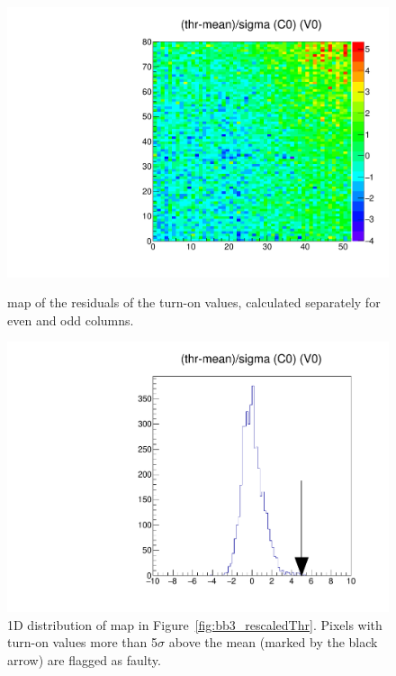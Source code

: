 \begin{figure}[!Hp]
\centering
\begin{minipage}{0.45\textwidth}
  \includegraphics[width=1.0\textwidth]{figures/bb3_rescaledThr.pdf}
  \caption{\roc map of the residuals of the \vthrcomp turn-on values, 
  calculated separately for even and odd columns.}
  \label{fig:bb3_rescaledThr}
\end{minipage}
\hspace{0.3cm}
\begin{minipage}{0.45\textwidth}
  \includegraphics[width=1.0\textwidth]{figures/bb3_dist_rescaledThr.pdf}
  \caption{1D distribution of \roc map in Figure~\ref{fig:bb3_rescaledThr}.
  Pixels with turn-on values more than 5$\sigma$ above the \roc mean 
  (marked by the black arrow) are flagged as faulty.}
  \label{fig:bb3_dist_rescaledThr}
\end{minipage}
\end{figure}


